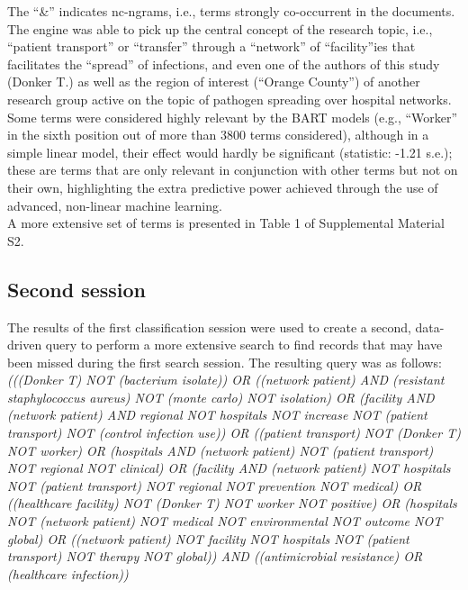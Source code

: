 \documentclass{article}
\begin{document}
The ``\&'' indicates nc-ngrams, i.e., terms strongly co-occurrent in the
documents.\\
The engine was able to pick up the central concept of the research
topic, i.e., ``patient transport'' or ``transfer'' through a ``network''
of ``facility''ies that facilitates the ``spread'' of infections, and
even one of the authors of this study (Donker T.) as well as the region
of interest (``Orange County'') of another research group active on the
topic of pathogen spreading over hospital networks. Some terms were
considered highly relevant by the BART models (e.g., ``Worker'' in the
sixth position out of more than 3800 terms considered), although in a
simple linear model, their effect would hardly be significant
(statistic: -1.21 s.e.); these are terms that are only relevant in
conjunction with other terms but not on their own, highlighting the
extra predictive power achieved through the use of advanced, non-linear
machine learning.\\
A more extensive set of terms is presented in Table 1 of Supplemental
Material S2.

\hypertarget{second-session}{%
\subsection{Second session}\label{second-session}}

The results of the first classification session were used to create a
second, data-driven query to perform a more extensive search to find
records that may have been missed during the first search session. The
resulting query was as follows:\\

\emph{(((Donker T) NOT (bacterium isolate)) OR ((network patient) AND
(resistant staphylococcus aureus) NOT (monte carlo) NOT isolation) OR
(facility AND (network patient) AND regional NOT hospitals NOT increase
NOT (patient transport) NOT (control infection use)) OR ((patient
transport) NOT (Donker T) NOT worker) OR (hospitals AND (network
patient) NOT (patient transport) NOT regional NOT clinical) OR (facility
AND (network patient) NOT hospitals NOT (patient transport) NOT regional
NOT prevention NOT medical) OR ((healthcare facility) NOT (Donker T) NOT
worker NOT positive) OR (hospitals NOT (network patient) NOT medical NOT
environmental NOT outcome NOT global) OR ((network patient) NOT facility
NOT hospitals NOT (patient transport) NOT therapy NOT global)) AND
((antimicrobial resistance) OR (healthcare infection))}
\end{document}
